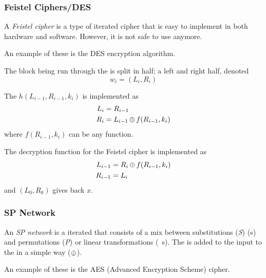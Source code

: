 \subsubsection{Feistel Ciphers/DES}\label{subsubsec:Feistel_Cipher_DES}
\begin{definition}\label{def:Feistel_Cipher}
  A \emph{Feistel cipher} is a type of iterated cipher that is easy to implement in both hardware and software.
  However, it is not safe to use anymore.

  An example of these is the DES encryption algorithm.

  The block being run through the  is split in half; a left and right half, denoted
  \begin{equation}\label{eq:Feistel_Cipher_Block}
    w_{i} = (L_{i}, R_{i})
  \end{equation}

  The  $h(L_{i-1}, R_{i-1}, k_{i})$ is implemented as
  \begin{equation}\label{eq:Feistel_Cipher_Round_Function_Encryption}
    \begin{aligned}
      L_{i} &= R_{i-1} \\
      R_{i} &= L_{i-1} \operatorname{\oplus} f(R_{i-1}, k_{i})
    \end{aligned}
  \end{equation}
  where $f(R_{i-1}, k_{i})$ can be any function.

  The decryption function for the Feistel cipher is implemented as
  \begin{equation}\label{eq:Feistel_Cipher_Round_Function_Decryption}
    \begin{aligned}
      L_{i-1} &= R_{i} \operatorname{\oplus} f(R_{i-1}, k_{i}) \\
      R_{i-1} &= L_{i}
    \end{aligned}
  \end{equation}
  and $(L_{0}, R_{0})$ gives back $x$.
\end{definition}

\subsubsection{SP Network}\label{subsubsec:SP_Network}
\begin{definition}[SP Network]\label{def:SP_Network}
  An \emph{SP network} is a iterated  that consists of a mix between substitutions (\emph{S}) (s) and permutations (\emph{P}) or linear transformations (~\pageref{subsubsec:Transposition_Cipher}s).
  The  is added to the input to the  in a simple way ($\operatorname{\oplus}$).

  An example of these is the AES (Advanced Encryption Scheme) cipher.
\end{definition}

